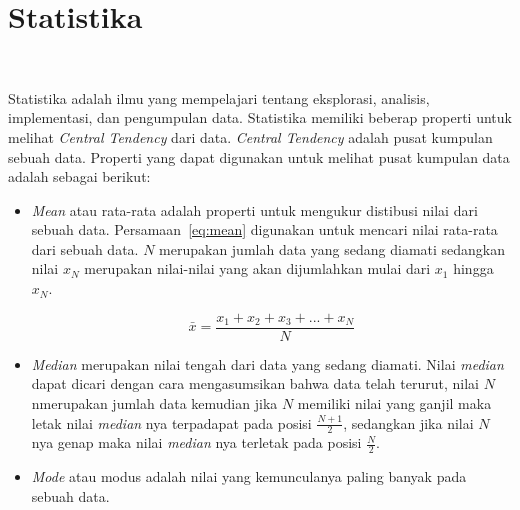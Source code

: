\section{Statistika}~\cite{han:22:datmin}
\label{sec:stat}

Statistika adalah ilmu yang mempelajari tentang eksplorasi, analisis, implementasi, dan pengumpulan data. Statistika memiliki beberap properti untuk melihat \textit{Central Tendency} dari data. \textit{Central Tendency} adalah pusat kumpulan sebuah data. Properti yang dapat digunakan untuk melihat pusat kumpulan data adalah sebagai berikut:
\begin{itemize}
    \item \textit{Mean} atau rata-rata adalah properti untuk mengukur distibusi nilai dari sebuah data. Persamaan~\ref{eq:mean} digunakan untuk mencari nilai rata-rata dari sebuah data. $N$ merupakan jumlah data yang sedang diamati sedangkan nilai $x_N$ merupakan nilai-nilai yang akan dijumlahkan mulai dari $x_1$ hingga $x_N$.

    \begin{equation}
    \label{eq:mean}
        \bar{x} = \frac{x_1+x_2+x_3+...+x_N}{N}
    \end{equation}

     \item \textit{Median} merupakan nilai tengah dari data yang sedang diamati. Nilai \textit{median} dapat dicari dengan cara mengasumsikan bahwa data telah terurut, nilai $N$ nmerupakan jumlah data kemudian jika $N$ memiliki nilai yang ganjil maka letak nilai \textit{median} nya terpadapat pada posisi $\frac{N+1}{2}$, sedangkan jika nilai $N$ nya genap maka nilai \textit{median} nya terletak pada posisi $\frac{N}{2}$.

     \item \textit{Mode} atau modus adalah nilai yang kemunculanya paling banyak pada sebuah data.
\end{itemize}

